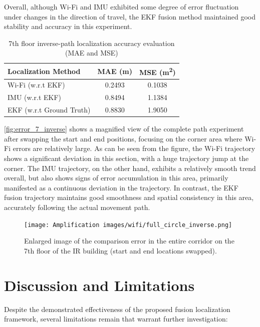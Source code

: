 \documentclass[12pt,a4paper]{article}
\numberwithin{equation}{section}
\begin{document}
Overall, although Wi-Fi and IMU exhibited some degree of error fluctuation under
changes in the direction of travel, the EKF fusion method maintained good
stability and accuracy in this experiment.
\begin{table}[H]
  \centering
  \caption{7th floor inverse-path localization accuracy evaluation (MAE and
    MSE)}
  \label{tab:7th_inverse_accuracy}
  \begin{tabular}{lcc}
    \toprule
    \textbf{Localization Method} & \textbf{MAE (m)} & \textbf{MSE (m\textsuperscript{2})} \\
    \midrule
    Wi-Fi (w.r.t EKF) & 0.2493 & 0.1038 \\
    IMU (w.r.t EKF) & 0.8494 & 1.1384 \\
    EKF (w.r.t Ground Truth) & 0.8830 & 1.9050 \\
    \bottomrule
  \end{tabular}
\end{table}

\autoref{fig:error_7_inverse} shows a magnified view of the complete path
experiment after swapping the start and end positions, focusing on the corner
area where Wi-Fi errors are relatively large. As can be seen from the figure,
the Wi-Fi trajectory shows a significant deviation in this section, with a huge
trajectory jump at the corner. The IMU trajectory, on the other hand, exhibits a
relatively smooth trend overall, but also shows signs of error accumulation in
this area, primarily manifested as a continuous deviation in the trajectory. In
contrast, the EKF fusion trajectory maintains good smoothness and spatial
consistency in this area, accurately following the actual movement path.
\begin{figure}[H]
  \centering
  \texttt{[image: Amplification
    images/wifi/full\_circle\_inverse.png]}
  \caption{Enlarged image of the comparison error in the entire corridor on the
    7th floor of the IR building (start and end locations swapped).}
  \label{fig:error_7_inverse}
\end{figure}

  
\newpage  
\section{Discussion and Limitations}
Despite the demonstrated effectiveness of the proposed fusion localization
framework, several limitations remain that warrant further investigation:
\end{document}
